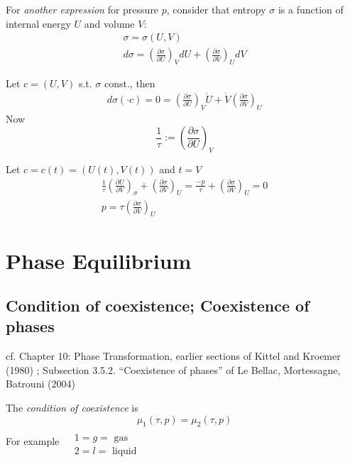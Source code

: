 \documentclass[10pt]{amsart}
\begin{document}
\begin{multicols*}{2}
For \emph{another expression} for pressure $p$, consider that entropy $\sigma$ is a function of internal energy $U$ and volume $V$:
\[
\begin{gathered}
	\sigma = \sigma(U,V) \\ 
	d\sigma = \left(\frac{ \partial \sigma }{\partial U } \right)_V dU + \left(\frac{ \partial \sigma }{\partial V } \right)_U dV 
\end{gathered}
\]

Let $c=(U,V)$ s.t. $\sigma$ const., then 
\[
\begin{gathered}
d\sigma(\cdot{c}) = 0 = \left( \frac{ \partial \sigma}{ \partial U} \right)_V \dot{U} + \dot{V} \left( \frac{\partial \sigma}{\partial V} \right)_U
\end{gathered}
\]
Now
\[
\frac{1}{\tau} := \left( \frac{ \partial \sigma}{ \partial U} \right)_V
\]

Let $c=c(t) = (U(t), V(t))$ and $t=V$
\[
\begin{gathered} 
\frac{1}{\tau} \left( \frac{ \partial U}{ \partial V} \right)_{\sigma} + \left( \frac{ \partial \sigma }{ \partial V} \right)_U = \frac{-p}{\tau} + \left(\frac{ \partial \sigma}{\partial V} \right)_U = 0 \\
p = \tau \left( \frac{\partial \sigma}{ \partial V} \right)_U
\end{gathered}
\]


\section{Phase Equilibrium}

\subsection{Condition of coexistence; Coexistence of phases}

cf. Chapter 10: Phase Transformation, earlier sections of Kittel and Kroemer (1980) \cite{CKittelHKroemer1980}; Subsection 3.5.2. ``Coexistence of phases'' of Le Bellac, Mortessagne, Batrouni (2004) \cite{MLeBellacFMortessagneGBatrouni2004}

The \emph{condition of coexistence} is 
\[
\mu_1(\tau,p) = \mu_2(\tau,p)
\]
For example $\begin{aligned} & \quad \\
  & 1 = g = \text{ gas } \\
  & 2 = l = \text{ liquid } \end{aligned}$


\end{multicols*}
\end{document}
